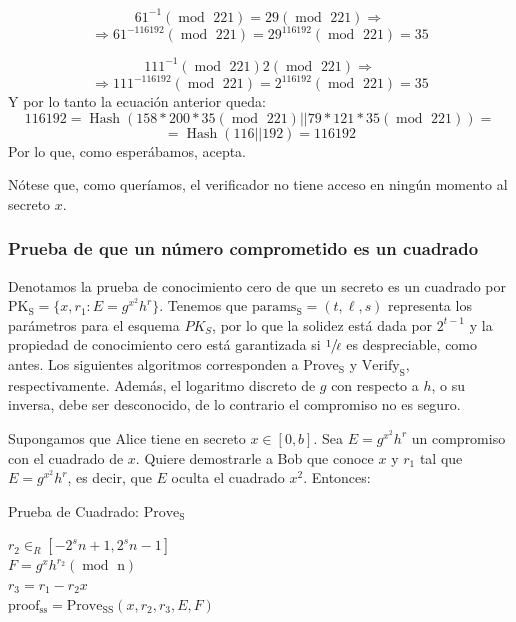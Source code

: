 $$61^{-1} (\operatorname{mod} \text{ 221}) = 29 (\operatorname{mod} \text{ 221}) \Rightarrow$$ $$\Rightarrow 61^{-116192} (\operatorname{mod} \text{ 221}) = 29^{116192} (\operatorname{mod} \text{ 221}) = 35$$

$$111^{-1} (\operatorname{mod} \text{ 221}) 2 (\operatorname{mod} \text{ 221}) \Rightarrow$$ $$\Rightarrow 111^{-116192} (\operatorname{mod} \text{ 221}) = 2^{116192} (\operatorname{mod} \text{ 221}) = 35$$
Y por lo tanto la ecuación anterior queda:
$$ 116192 = \operatorname{Hash}(158*200*35 (\operatorname{mod} \text{ 221})|| 79*121*35 (\operatorname{mod} \text{ 221})) = $$
$$ = \operatorname{Hash}(116||192) = 116192$$
Por lo que, como esperábamos, acepta.

Nótese que, como queríamos, el verificador no tiene acceso en ningún momento al secreto $x$.

\subsubsection{Prueba de que un número comprometido es un cuadrado}  \label{proof:s}

Denotamos la prueba de conocimiento cero de que un secreto es un cuadrado por $\operatorname{PK_{S}} = \{x, r_{1}: E = g^{x^{2}} h^{r}\}$. Tenemos que $\operatorname{params_{S}} = (t, \ell, s)$ representa los parámetros para el esquema $PK_{S}$, por lo que la solidez está dada por $2^{t-1}$ y la propiedad de conocimiento cero está garantizada si $\sfrac{1}{\ell}$ es despreciable, como antes. Los siguientes algoritmos corresponden a $\operatorname{Prove_{S}}$ y $\operatorname{Verify_{S}}$, respectivamente. Además, el logaritmo discreto de $g$ con respecto a $h$, o su inversa, debe ser desconocido, de lo contrario el compromiso no es seguro.

Supongamos que Alice tiene en secreto $x \in [0, b]$. Sea $E = g^{x^{2}} h^{r}$ un compromiso con el cuadrado de $x$. Quiere demostrarle a Bob que conoce $x$ y $r_{1}$ tal que $E = g^{x^{2}} h^{r}$, es decir, que $E$ oculta el cuadrado $x^{2}$. Entonces: \\
\begin{minipage}{0.9\textwidth}
    \begin{algorithm}[H] \label{alg:prove s}
        \caption{Prueba de Cuadrado: $\operatorname{Prove_{S}}$}

        $r_{2} \in_{R} [-2^{s}n+1, 2^{s}n-1]$ \\
        $F = g^{x}h^{r_{2}} (\operatorname{mod} \text{ n})$ \\
        $r_{3} = r_{1} - r_{2}x$ \\
        $\operatorname{proof_{ss}} = \operatorname{Prove_{SS}}(x, r_{2}, r_{3}, E, F)$ \\

    \end{algorithm}
\end{minipage}

